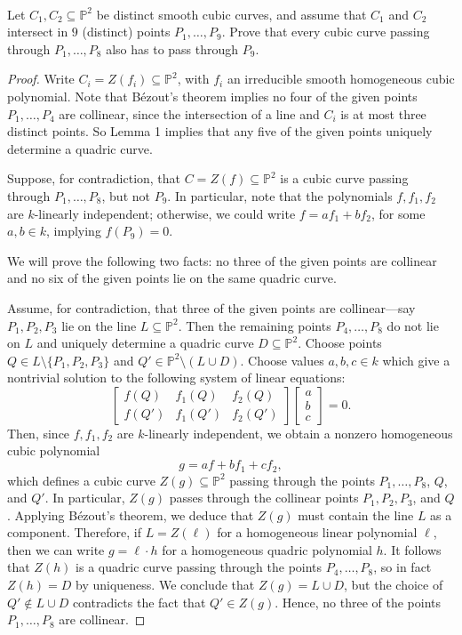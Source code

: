 \documentclass[12pt]{article}
\newlength{\myparskip}
\newenvironment{fullbox}{\begin{lrbox}{\savefullbox}\begin{minipage}{\dimexpr\textwidth-2\fboxsep\relax}\setlength{\parskip}{\myparskip}}{\end{minipage}\end{lrbox}\framebox[\textwidth]{\usebox{\savefullbox}}}
\newenvironment{pbox}[1][]{\begin{fullbox}\ifx#1\empty\else\paragraph{#1}\phantom{}\fi}{\end{fullbox}}
\theoremstyle{definition}
\renewcommand{\P}{\mathbb{P}}
\newcommand{\<}{\langle}
\renewcommand{\>}{\rangle}
\newcommand{\seq}{\subseteq}
\begin{document}
\begin{pbox}
    Let $C_1, C_2 \seq \P^2$ be distinct smooth cubic curves, and assume that $C_1$ and $C_2$ intersect in $9$ (distinct) points $P_1, \dots, P_9$.
    Prove that every cubic curve passing through $P_1, \dots, P_8$ also has to pass through $P_9$.
\end{pbox}

\begin{proof}
    Write $C_i = Z(f_i) \seq \P^2$, with $f_i$ an irreducible smooth homogeneous cubic polynomial.
    Note that B\'ezout's theorem implies no four of the given points $P_1, \dots, P_4$ are collinear, since the intersection of a line and $C_i$ is at most three distinct points.
    So Lemma 1 implies that any five of the given points uniquely determine a quadric curve.

    Suppose, for contradiction, that $C = Z(f) \seq \P^2$ is a cubic curve passing through $P_1, \dots, P_8$, but not $P_9$.
    In particular, note that the polynomials $f, f_1, f_2$ are $k$-linearly independent; otherwise, we could write $f = af_1 + bf_2$, for some $a, b \in k$, implying $f(P_9) = 0$.

    We will prove the following two facts: no three of the given points are collinear and no six of the given points lie on the same quadric curve.

    Assume, for contradiction, that three of the given points are collinear---say $P_1, P_2, P_3$ lie on the line $L \seq \P^2$.
    Then the remaining points $P_4, \dots, P_8$ do not lie on $L$ and uniquely determine a quadric curve $D \seq \P^2$.
    Choose points $Q \in L \setminus \{P_1, P_2, P_3\}$ and $Q' \in \P^2 \setminus (L \cup D)$.
    Choose values $a, b, c \in k$ which give a nontrivial solution to the following system of linear equations:
    \[
        \begin{bmatrix}
            f(Q) & f_1(Q) & f_2(Q) \\
            f(Q') & f_1(Q') & f_2(Q')
        \end{bmatrix}
        \begin{bmatrix}
            a \\ b \\ c
        \end{bmatrix}
        = 0.
    \]
    Then, since $f, f_1, f_2$ are $k$-linearly independent, we obtain a nonzero homogeneous cubic polynomial
    \[
        g = af + bf_1 + cf_2,
    \]
    which defines a cubic curve $Z(g) \seq \P^2$ passing through the points $P_1, \dots, P_8$, $Q$, and $Q'$.
    In particular, $Z(g)$ passes through the collinear points $P_1, P_2, P_3$, and $Q$.
    Applying B\'ezout's theorem, we deduce that $Z(g)$ must contain the line $L$ as a component.
    Therefore, if $L = Z(\ell)$ for a homogeneous linear polynomial $\ell$, then we can write $g = \ell \cdot h$ for a homogeneous quadric polynomial $h$.
    It follows that $Z(h)$ is a quadric curve passing through the points $P_4, \dots, P_8$, so in fact $Z(h) = D$ by uniqueness.
    We conclude that $Z(g) = L \cup D$, but the choice of $Q' \notin L \cup D$ contradicts the fact that $Q' \in Z(g)$.
    Hence, no three of the points $P_1, \dots, P_8$ are collinear.


\end{proof}
\end{document}
